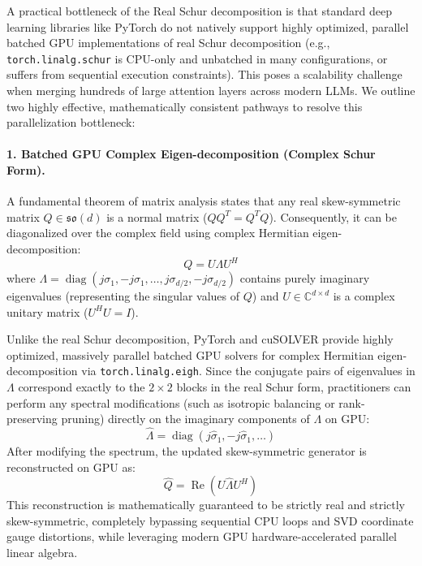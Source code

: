 A practical bottleneck of the Real Schur decomposition is that standard deep learning libraries like PyTorch do not natively support highly optimized, parallel batched GPU implementations of real Schur decomposition (e.g., \texttt{torch.linalg.schur} is CPU-only and unbatched in many configurations, or suffers from sequential execution constraints). This poses a scalability challenge when merging hundreds of large attention layers across modern LLMs. We outline two highly effective, mathematically consistent pathways to resolve this parallelization bottleneck:

\paragraph{1. Batched GPU Complex Eigen-decomposition (Complex Schur Form).}
A fundamental theorem of matrix analysis states that any real skew-symmetric matrix $Q \in \mathfrak{so}(d)$ is a normal matrix ($Q Q^T = Q^T Q$). Consequently, it can be diagonalized over the complex field using complex Hermitian eigen-decomposition:
\begin{equation}
Q = U \Lambda U^H
\end{equation}
where $\Lambda = \operatorname{diag}(j \sigma_1, -j \sigma_1, \dots, j \sigma_{d/2}, -j \sigma_{d/2})$ contains purely imaginary eigenvalues (representing the singular values of $Q$) and $U \in \mathbb{C}^{d \times d}$ is a complex unitary matrix ($U^H U = I$). 

Unlike the real Schur decomposition, PyTorch and cuSOLVER provide highly optimized, massively parallel batched GPU solvers for complex Hermitian eigen-decomposition via \texttt{torch.linalg.eigh}. Since the conjugate pairs of eigenvalues in $\Lambda$ correspond exactly to the $2\times 2$ blocks in the real Schur form, practitioners can perform any spectral modifications (such as isotropic balancing or rank-preserving pruning) directly on the imaginary components of $\Lambda$ on GPU:
\begin{equation}
\hat{\Lambda} = \operatorname{diag}(j \hat{\sigma}_1, -j \hat{\sigma}_1, \dots)
\end{equation}
After modifying the spectrum, the updated skew-symmetric generator is reconstructed on GPU as:
\begin{equation}
\hat{Q} = \operatorname{Re}\left( U \hat{\Lambda} U^H \right)
\end{equation}
This reconstruction is mathematically guaranteed to be strictly real and strictly skew-symmetric, completely bypassing sequential CPU loops and SVD coordinate gauge distortions, while leveraging modern GPU hardware-accelerated parallel linear algebra.

